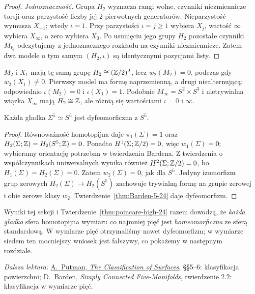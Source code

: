 \begin{proof}
\emph{Jednoznaczność.}
Grupa $H_2$ wyznacza rangi wolne,
czynniki niezmiennicze torsji oraz
parzystość liczby jej $2$-pierwotnych
generatorów. Nieparzystość wymusza
$X_{-1}$; wtedy $\iota=1$.
Przy parzystości $\iota=j\geq1$
wybiera $X_j$, wartość $\infty$
wybiera $X_\infty$, a zero wybiera
$X_0$. Po usunięciu jego grupy
$H_2$ pozostałe czynniki $M_{k_r}$
odczytujemy z jednoznacznego rozkładu
na czynniki niezmiennicze.
Zatem dwa modele o tym samym
$(H_2,\iota)$ są identycznymi
pozycjami listy.
\end{proof}

\begin{przyklad}
$M_2$ i $X_1$ mają tę samą grupę
$H_2\cong(\mathbb{Z}/2)^2$, lecz
$w_2(M_2)=0$, podczas gdy
$w_2(X_1)\ne0$. Pierwszy model ma
formę naprzemienną, a drugi
niealternującą; odpowiednio
$\iota(M_2)=0$ i $\iota(X_1)=1$.
Podobnie $M_\infty=S^2\times S^3$
i nietrywialna wiązka $X_\infty$
mają $H_2\cong\mathbb{Z}$, ale różnią się
wartościami $\iota=0$ i $\infty$.
\end{przyklad}

\begin{wniosek}
\label{cor:poincare-five-24}
Każda gładka $\Sigma^5\simeq S^5$
jest dyfeomorficzna z $S^5$.
\end{wniosek}
\begin{proof}
Równoważność homotopijna daje
$\pi_1(\Sigma)=1$ oraz
$H_2(\Sigma;\mathbb{Z})=H_2(S^5;\mathbb{Z})=0$.
Ponadto $H^1(\Sigma;\mathbb{Z}/2)=0$, więc
$w_1(\Sigma)=0$; wybieramy orientację
potrzebną w twierdzeniu Bardena.
Z twierdzenia o współczynnikach
uniwersalnych wynika również
$H^2(\Sigma;\mathbb{Z}/2)=0$, bo
$H_1(\Sigma)=H_2(\Sigma)=0$.
Zatem $w_2(\Sigma)=0$, jak dla $S^5$.
Jedyny izomorfizm grup zerowych
$H_2(\Sigma)\to H_2(S^5)$
zachowuje trywialną formę na grupie zerowej
i obie zerowe klasy $w_2$.
Twierdzenie~\ref{thm:Barden-5-24}
daje dyfeomorfizm.
\end{proof}

Wyniki tej sekcji i
Twierdzenie~\ref{thm:poincare-high-24}
razem dowodzą, że \emph{każda
gładka} sfera homotopijna wymiaru
co najmniej pięć jest
\emph{homeomorficzna} ze sferą
standardową. W wymiarze pięć
otrzymaliśmy nawet dyfeomorfizm;
w wymiarze siedem ten mocniejszy
wniosek jest fałszywy, co pokażemy
w następnym rozdziale.

\par\smallskip
{\footnotesize\noindent\emph{Dalsza lektura:}
\href{https://academicweb.nd.edu/~andyp/notes/ClassificationSurfacesLong.pdf}
{A.\ Putman, \emph{The Classification of Surfaces}},
§§5--6: klasyfikacja powierzchni;
\href{https://www.sas.rochester.edu/mth/sites/doug-ravenel/otherpapers/barden.pdf}
{D.\ Barden, \emph{Simply Connected Five-Manifolds}},
twierdzenie 2.2: klasyfikacja w wymiarze pięć.\par}

\clearpage
